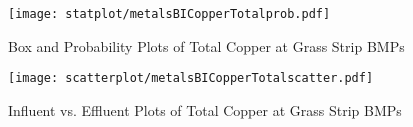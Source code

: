         \begin{figure}[hb]   %
            \centering
            \texttt{[image: statplot/metalsBICopperTotalprob.pdf]}
            \caption{Box and Probability Plots of Total Copper at Grass Strip BMPs}
        \end{figure}         %
        
        
        \begin{figure}[hb]   %
            \centering
            \texttt{[image: scatterplot/metalsBICopperTotalscatter.pdf]}
            \caption{Influent vs. Effluent Plots of Total Copper at Grass Strip BMPs}
        \end{figure}         %
        \clearpage
        
